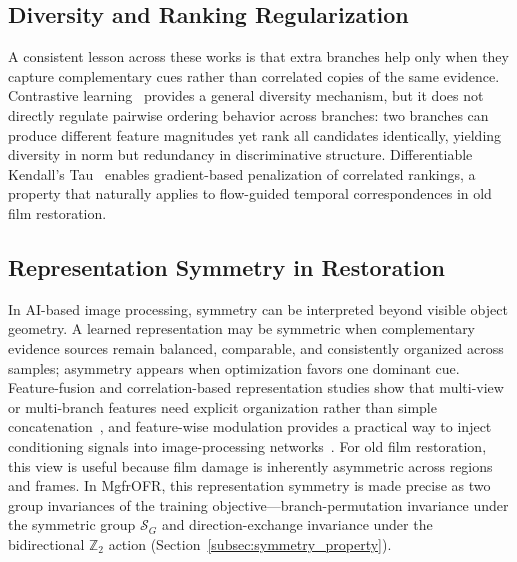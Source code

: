 \subsection{Diversity and Ranking Regularization}
\label{subsec:diversity_ranking}

A consistent lesson across these works is that extra branches help only when they capture complementary cues rather than correlated copies of the same evidence. Contrastive learning~\cite{chen2020mocov2} provides a general diversity mechanism, but it does not directly regulate pairwise ordering behavior across branches: two branches can produce different feature magnitudes yet rank all candidates identically, yielding diversity in norm but redundancy in discriminative structure. Differentiable Kendall's Tau~\cite{zheng2023diffkendall} enables gradient-based penalization of correlated rankings, a property that naturally applies to flow-guided temporal correspondences in old film restoration.

\subsection{Representation Symmetry in Restoration}
\label{subsec:symmetry_ai}

In AI-based image processing, symmetry can be interpreted beyond visible object geometry. A learned representation may be symmetric when complementary evidence sources remain balanced, comparable, and consistently organized across samples; asymmetry appears when optimization favors one dominant cue. Feature-fusion and correlation-based representation studies show that multi-view or multi-branch features need explicit organization rather than simple concatenation~\cite{yu2021multiview_tensor_fusion,qian2020multiview_matrix_correlation}, and feature-wise modulation provides a practical way to inject conditioning signals into image-processing networks~\cite{perez2018film}. For old film restoration, this view is useful because film damage is inherently asymmetric across regions and frames. In MgfrOFR, this representation symmetry is made precise as two group invariances of the training objective---branch-permutation invariance under the symmetric group $\mathcal{S}_G$ and direction-exchange invariance under the bidirectional $\mathbb{Z}_2$ action (Section~\ref{subsec:symmetry_property}).

